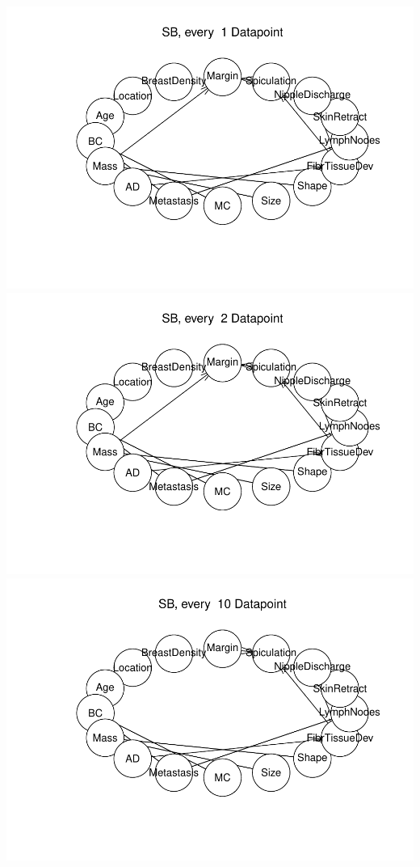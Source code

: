 \documentclass[]{article}
\begin{document}
\includegraphics{BN_Ass2_files/figure-latex/unnamed-chunk-3-4.pdf}
\includegraphics{BN_Ass2_files/figure-latex/unnamed-chunk-3-5.pdf}
\includegraphics{BN_Ass2_files/figure-latex/unnamed-chunk-3-6.pdf}
\end{document}
